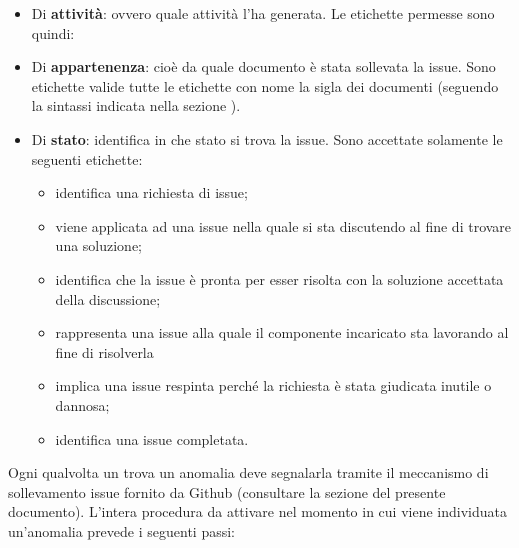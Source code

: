 				\begin{itemize}
				    \item Di \textbf{attività}: ovvero quale attività l'ha generata. Le etichette permesse sono quindi: 
				    \item Di \textbf{appartenenza}: cioè da quale documento è stata sollevata la issue. Sono etichette valide tutte le etichette con nome la sigla dei documenti (seguendo la sintassi indicata nella sezione ).
				    \item Di \textbf{stato}: identifica in che stato si trova la issue. Sono accettate solamente le seguenti etichette:
				\begin{itemize}
				    \item {} identifica una richiesta di issue;
				    \item {} viene applicata ad una issue nella quale si sta discutendo al fine di trovare una soluzione;
				    \item {} identifica che la issue è pronta per esser risolta con la soluzione accettata della discussione;
				    \item {} rappresenta una issue alla quale il componente incaricato sta lavorando al fine di risolverla
				    \item {} implica una issue respinta perché la richiesta è stata giudicata inutile o dannosa;
				    \item {} identifica una issue completata.
				\end{itemize}
				\end{itemize}
				Ogni qualvolta un  trova un anomalia deve segnalarla tramite il meccanismo di sollevamento issue fornito da Github (consultare la sezione  del presente documento). L'intera procedura da attivare nel momento in cui viene individuata un'anomalia prevede i seguenti passi:
